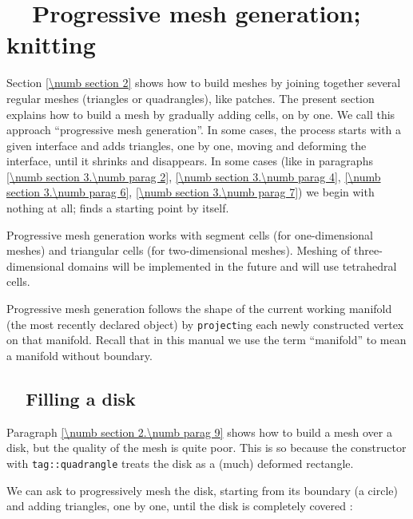 
\chapter{~~Progressive mesh generation; knitting}\label{\numb section 3}

Section \ref{\numb section 2} shows how to build meshes by joining together several regular meshes
(triangles or quadrangles), like patches.
The present section explains how to build a mesh by gradually adding cells, on by one.
We call this approach ``progressive mesh generation''.
In some cases, the process starts with a given interface and adds triangles, one by one,
moving and deforming the interface, until it shrinks and disappears.
In some cases (like in paragraphs \ref{\numb section 3.\numb parag 2},
\ref{\numb section 3.\numb parag 4}, \ref{\numb section 3.\numb parag 6},
\ref{\numb section 3.\numb parag 7}) we begin with nothing at all;
{\maniFEM} finds a starting point by itself.

Progressive mesh generation works with segment cells (for one-dimensional meshes) and
triangular cells (for two-dimensional meshes).
Meshing of three-dimensional domains will be implemented in the future and will use tetrahedral
cells.

Progressive mesh generation follows the shape of the current working manifold (the most recently
declared {\small\tt {}} object) by {\small\tt project}ing each newly constructed vertex
on that manifold.
Recall that in this manual we use the term ``manifold'' to mean a manifold without boundary.


\section{~~Filling a disk}\label{\numb section 3.\numb parag 1}

Paragraph \ref{\numb section 2.\numb parag 9} shows how to build a mesh over a disk,
but the quality of the mesh is quite poor.
This is so because the {\small\tt {}} constructor with {\small\tt \textcolor{tag}{tag}::quadrangle} treats the
disk as a (much) deformed rectangle.

We can ask {\maniFEM} to progressively mesh the disk, starting from its boundary (a circle)
and adding triangles, one by one, until the disk is completely covered :


